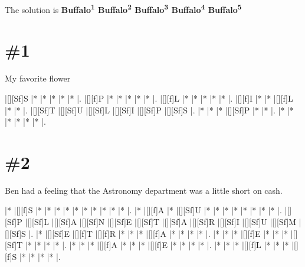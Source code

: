 \documentclass[letterpaper]{article}
\begin{document}
The solution is \textbf{Buffalo\textsuperscript{1} Buffalo\textsuperscript{2} Buffalo\textsuperscript{3} Buffalo\textsuperscript{4} Buffalo\textsuperscript{5}}

\newpage
\section*{\#1}
My favorite flower

\vspace*{1em}
\begin{Puzzle}{6}{7}
|[][Sf]S  |*        |*        |*        |*        |*        |. 
|[][f]P   |*        |*        |*        |*        |*        |.  
|[][f]L   |*        |*        |*        |*        |*        |.
|[][f]I   |*        |*        |[][f]L   |*        |*        |.  
|[][Sf]T  |[][Sf]U  |[][Sf]L  |[][Sf]I  |[][Sf]P  |[][Sf]S  |.
|*        |*        |*        |[][Sf]P  |*        |*        |. 
|*        |*        |*        |*        |*        |*        |.
\end{Puzzle}

\section*{\#2}
Ben had a feeling that the Astronomy department was a little short on cash.
\vspace*{1em}
\begin{Puzzle}{12}{8}
|*        |[][f]S   |*        |*        |*        |*        |*        |*        |*        |*        |*        |*        |.
|*        |[][f]A   |*        |[][Sf]U  |*        |*        |*        |*        |*        |*        |*        |*        |.
|[][Sf]P  |[][Sf]L  |[][Sf]A  |[][Sf]N  |[][Sf]E  |[][Sf]T  |[][Sf]A  |[][Sf]R  |[][Sf]I  |[][Sf]U  |[][Sf]M  |[][Sf]S  |.
|*        |[][Sf]E  |[][f]T   |[][f]R   |*        |*        |*        |[][f]A   |*        |*        |*        |*        |.
|*        |*        |*        |[][f]E   |*        |*        |*        |[][Sf]T  |*        |*        |*        |*        |.
|*        |*        |*        |[][f]A   |*        |*        |*        |[][f]E   |*        |*        |*        |*        |.
|*        |*        |*        |[][f]L   |*        |*        |*        |[][f]S   |*        |*        |*        |*        |.
\end{Puzzle}
\end{document}
